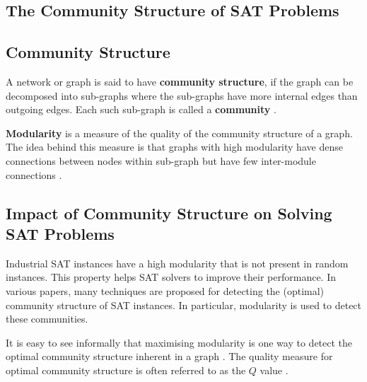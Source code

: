 \documentclass[12pt]{book}
\begin{document}
\begin{examp}
\begin{examp}
\begin{examp}
{%
\chapter{The Community Structure of SAT Problems}
\label{cha:CommunityStr}
\section{Community Structure}
\label{sec:Community Structure}

\begin{defi}\label{def:CommunityStr1}
      A network or graph is said to have \textbf{community structure}, if the graph can be decomposed into sub-graphs where 
	  the sub-graphs have more internal edges than outgoing edges. Each such sub-graph is called a \textbf{community} \cite{h16}. 
\end{defi}
\begin{defi}\label{def:CommunityStr2} 
      \textbf{Modularity} is a measure of the quality of the community structure of a graph. The idea behind this measure is 
	  that graphs with high modularity have dense connections between nodes within sub-graph but have few inter-module connections \cite{h16}.
\end{defi}

\section{Impact of Community Structure on Solving SAT Problems}
\label{sec:ImpCommunity}

Industrial SAT instances have a high modularity that is not present in random instances. This property helps SAT solvers to improve their
performance. In various papers, many techniques are proposed for detecting the (optimal) community structure of SAT instances. In particular, 
modularity is used to detect these communities. 

It is easy to see informally that maximising modularity is one way to detect the optimal community structure inherent in a graph .
The quality measure for optimal community structure is often referred to as the $Q$ value \cite{h16}.

}
\end{examp}
\end{examp}
\end{examp}
\end{document}
